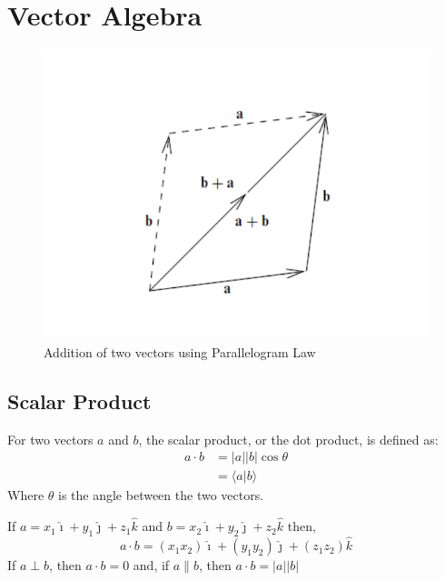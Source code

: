 \section{Vector Algebra}
\begin{figure}[H]
	\centering
	\includegraphics[scale=1]{figures/vector_add.pdf}
	\caption{\label{vector_add} Addition of two vectors using Parallelogram Law}
\end{figure}
\subsection{Scalar Product}
\begin{defn}
For two vectors $a$ and $b$, the scalar product, or the dot product, is defined as:
\begin{align*}
a \cdot b &= \lvert a \rvert \lvert b \rvert \cos\theta \\
&= \langle a |b \rangle
\end{align*}
Where $\theta$ is the angle between the two vectors.
\end{defn}
If $a = x_1 \hat{\imath} + y_1 \hat{\jmath} + z_1 \hat{k}$ and $b = x_2 \hat{\imath} + y_2 \hat{\jmath} + z_2 \hat{k}$ then,
$$a \cdot b = (x_1 x_2)\hat{\imath} + (y_1 y_2)\hat{\jmath} + (z_1 z_2)\hat{k}$$
If $a \perp b$, then $a\cdot b = 0$ and, if $a \parallel b$, then $a\cdot b = |a||b|$

